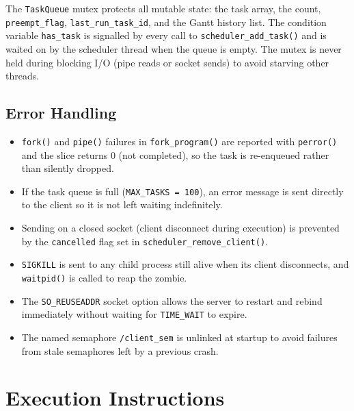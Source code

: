 \documentclass[12pt]{article}
\begin{document}
The \texttt{TaskQueue} mutex protects all mutable state: the task array, the count,
\texttt{preempt\_flag}, \texttt{last\_run\_task\_id}, and the Gantt history list.
The condition variable \texttt{has\_task} is signalled by every call to
\texttt{scheduler\_add\_task()} and is waited on by the scheduler thread when the queue
is empty. The mutex is never held during blocking I/O (pipe reads or socket sends) to
avoid starving other threads.

\subsection{Error Handling}

\begin{itemize}
    \item \texttt{fork()} and \texttt{pipe()} failures in \texttt{fork\_program()} are
          reported with \texttt{perror()} and the slice returns 0 (not completed), so
          the task is re-enqueued rather than silently dropped.
    \item If the task queue is full (\texttt{MAX\_TASKS = 100}), an error message is
          sent directly to the client so it is not left waiting indefinitely.
    \item Sending on a closed socket (client disconnect during execution) is prevented
          by the \texttt{cancelled} flag set in \texttt{scheduler\_remove\_client()}.
    \item \texttt{SIGKILL} is sent to any child process still alive when its client
          disconnects, and \texttt{waitpid()} is called to reap the zombie.
    \item The \texttt{SO\_REUSEADDR} socket option allows the server to restart and
          rebind immediately without waiting for \texttt{TIME\_WAIT} to expire.
    \item The named semaphore \texttt{/client\_sem} is unlinked at startup to avoid
          failures from stale semaphores left by a previous crash.
\end{itemize}

\section{Execution Instructions}
\end{document}
